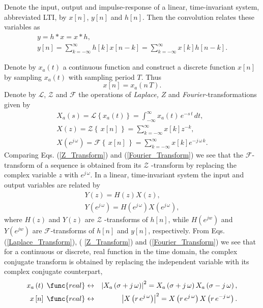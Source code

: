 \documentclass{sebase}
\begin{document}
Denote the input, output and impulse-response of a linear, time-invariant
system, abbreviated LTI, by $x\left[ n\right] $, $y\left[ n\right] $ and $h%
\left[ n\right] $. Then the convolution relates these variables as 
\begin{gather}
y=h\ast x=x\ast h, \\
y\left[ n\right] =\sum_{k=-\infty }^{\infty }h\left[ k\right] x\left[ n-k%
\right] =\sum_{k=-\infty }^{\infty }x\left[ k\right] h\left[ n-k\right] .
\end{gather}

Denote by $x_{a}(t)$ a continuous function and construct a discrete function 
$x[n]$ by sampling $x_{a}(t)$ with sampling period $T$. Thus 
\begin{equation}
x\left[ n\right] =x_{a}\left( n\,T\right) .
\end{equation}
Denote by $\mathcal{L}$, $\mathcal{Z}$ and $\mathcal{F}$ the operations of 
\textit{Laplace, }$Z$ and \textit{Fourier-}transformations given by 
\begin{gather}
X_{a}\left( s\right) =\mathcal{L}\left\{ x_{a}\left( t\right) \right\}
=\int_{-\infty }^{\infty }x_{a}\left( t\right) \,e^{-s\,t}\,dt,
\label{Laplace_Transform} \\
X\left( z\right) =\mathcal{Z}\left\{ \,x\left[ n\right] \,\right\}
=\sum_{k=-\infty }^{\infty }x\left[ k\right] z^{-k},  \label{Z_Transform} \\
X\left( e^{j\,\omega }\right) =\mathcal{F}\left\{ \,x\left[ n\right]
\,\right\} =\sum_{k=-\infty }^{\infty }x\left[ k\right] e^{-j\,\omega \,k}.
\label{Fourier_Transform}
\end{gather}
Comparing Eqs. (\ref{Z_Transform}) and (\ref{Fourier_Transform}) we see that
the $\mathcal{F}$-transform of a sequence is obtained from its $\mathcal{Z}$%
-transform by replacing the complex variable $z$ with $e^{j\,\omega }$. In a
linear, time-invariant system the input and output variables are related by 
\begin{gather}
Y\left( z\right) =H\left( z\right) X\left( z\right) , \\
Y\left( e^{j\,\omega }\right) =H\left( e^{j\,\omega }\right) X\left(
e^{j\,\omega }\right) ,
\end{gather}
where $H\left( z\right) $ and $Y\left( z\right) $ are $\mathcal{Z}$%
-transforms of $h\left[ n\right] $, while $H\left( e^{jw}\right) $ and $%
Y\left( e^{jw}\right) $ are $\mathcal{F}$-transforms of $h\left[ n\right] $
and $y\left[ n\right] $, respectively. From Eqs. (\ref{Laplace_Transform}), (%
\ref{Z_Transform}) and (\ref{Fourier_Transform}) we see that for a
continuous or discrete, real function in the time domain, the complex
conjugate transform is obtained by replacing the independent variable with
its complex conjugate counterpart, 
\begin{eqnarray}
x_{a}\left( t\right) \;\func{real} &\leftrightarrow &\left| X_{a}\left(
\sigma +j\,\omega \right) \right| ^{2}=X_{a}\left( \sigma +j\,\omega \right)
X_{a}\left( \sigma -j\,\omega \right) , \\
x\left[ n\right] \;\func{real} &\leftrightarrow &\left| X\left(
r\,e^{j\,\omega }\right) \right| ^{2}=X\left( r\,e^{j\,\omega }\right)
X\left( r\,e^{-j\,\omega }\right) .
\end{eqnarray}
\end{document}

